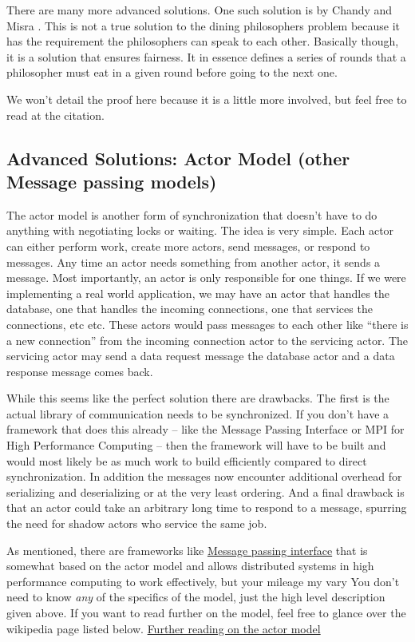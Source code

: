There are many more advanced solutions.
One such solution is by Chandy and Misra \cite{Chandy:1984:DPP:1780.1804}.
This is not a true solution to the dining philosophers problem because it has the requirement the philosophers can speak to each other.
Basically though, it is a solution that ensures fairness.
It in essence defines a series of rounds that a philosopher must eat in a given round before going to the next one.

We won't detail the proof here because it is a little more involved, but feel free to read at the citation.

\subsection{Advanced Solutions: Actor Model (other Message passing models)}

The actor model is another form of synchronization that doesn't have to do anything with negotiating locks or waiting.
The idea is very simple.
Each actor can either perform work, create more actors, send messages, or respond to messages.
Any time an actor needs something from another actor, it sends a message.
Most importantly, an actor is only responsible for one things.
If we were implementing a real world application, we may have an actor that handles the database, one that handles the incoming connections, one that services the connections, etc etc.
These actors would pass messages to each other like ``there is a new connection'' from the incoming connection actor to the servicing actor.
The servicing actor may send a data request message the database actor and a data response message comes back.

While this seems like the perfect solution there are drawbacks.
The first is the actual library of communication needs to be synchronized.
If you don't have a framework that does this already -- like the Message Passing Interface or MPI for High Performance Computing -- then the framework will have to be built and would most likely be as much work to build efficiently compared to direct synchronization.
In addition the messages now encounter additional overhead for serializing and deserializing or at the very least ordering.
And a final drawback is that an actor could take an arbitrary long time to respond to a message, spurring the need for shadow actors who service the same job.

As mentioned, there are frameworks like \href{https://en.wikipedia.org/wiki/Message\_Passing\_Interface}{Message passing interface} that is somewhat based on the actor model and allows distributed systems in high performance computing to work effectively, but your mileage my vary
You don't need to know \textit{any} of the specifics of the model, just the high level description given above.
If you want to read further on the model, feel free to glance over the wikipedia page listed below.
\href{https://en.wikipedia.org/wiki/Actor\_model}{Further reading on the actor model}

